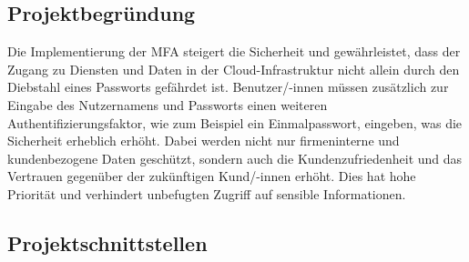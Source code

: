 \subsection{Projektbegründung} 
\label{sec:Projektbegruendung}
Die Implementierung der \acs*{MFA} steigert die Sicherheit und gewährleistet, dass der Zugang zu Diensten und Daten in der 
Cloud-Infrastruktur nicht allein durch den Diebstahl eines Passworts gefährdet ist. Benutzer/-innen müssen zusätzlich zur Eingabe des 
Nutzernamens und Passworts einen weiteren Authentifizierungsfaktor, wie zum Beispiel ein Einmalpasswort, eingeben, 
was die Sicherheit erheblich erhöht. Dabei werden nicht nur firmeninterne und kundenbezogene Daten geschützt, sondern auch 
die Kundenzufriedenheit und das Vertrauen gegenüber der zukünftigen Kund/-innen erhöht. Dies hat hohe Priorität und verhindert 
unbefugten Zugriff auf sensible Informationen.


\subsection{Projektschnittstellen} 
\label{sec:Projektschnittstellen}

